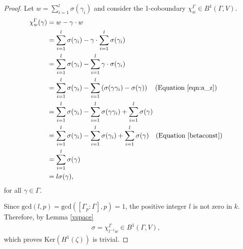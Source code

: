 \begin{proof}
Let $w = \sum_{i=1}^l \sigma(\gamma_i)$ and consider the 1-coboundary $\chi^\Gamma_w \in B^1(\Gamma, V)$.
\begin{align*}
	\chi_{w}^\Gamma(\gamma) &=  w - \gamma\cdot w \\
	&=  \sum_{i = 1}^l\sigma(\gamma_i) - \gamma\cdot \sum_{i = 1}^l\sigma(\gamma_i) \\
	&=  \sum_{i = 1}^l\sigma(\gamma_i) - \sum_{i = 1}^l\gamma \cdot \sigma(\gamma_i) \\
	&=  \sum_{i = 1}^l\sigma(\gamma_i) - \sum_{i = 1}^l\left(\sigma(\gamma\gamma_i) - \sigma(\gamma)\right) \quad(\textrm{Equation }\ref{eqn:a_z})\\
	&=  \sum_{i = 1}^l\sigma(\gamma_i) - \sum_{i = 1}^l \sigma(\gamma\gamma_i) +\sum_{i = 1}^l \sigma(\gamma) \\
	&=  \sum_{i = 1}^l\sigma(\gamma_i) - \sum_{i = 1}^l \sigma(\gamma_i) +\sum_{i = 1}^l \sigma(\gamma) \quad(\textrm{Equation }\ref{betaconst})\\
	&=  \sum_{i = 1}^l \sigma(\gamma) \\
	&= l\sigma(\gamma),
\end{align*}
for all $\gamma \in \Gamma$.

Since $\mathrm{gcd}(l, p) = \mathrm{gcd}\left([\Gamma_p:\Gamma], p\right) = 1$, the positive integer $l$ is not zero in $k$. Therefore, by Lemma \ref{vspace}
\begin{align*}
	\sigma = \chi^\Gamma_{l^{-1}w} \in B^1(\Gamma, V),
\end{align*}
which proves $\mathrm{Ker}\left(H^1(\zeta)\right)$ is trivial.
\end{proof}

